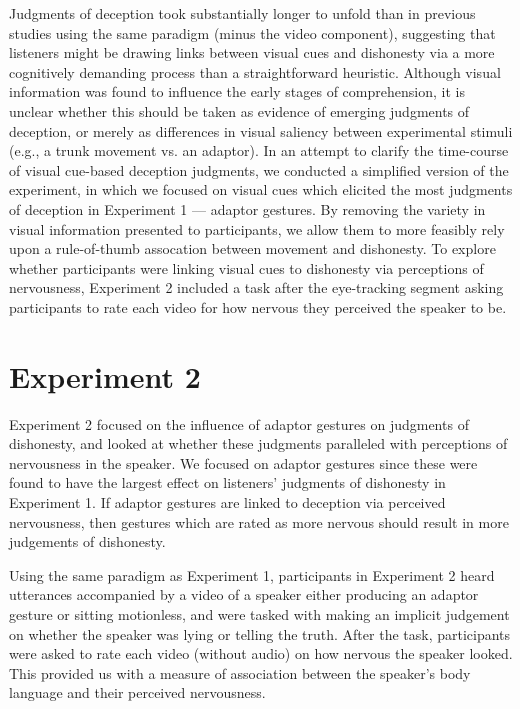 \documentclass[a4paper,man,natbib]{apa6}
\begin{document}
Judgments of deception took substantially longer to unfold than in previous studies using the same paradigm (minus the video component), suggesting that listeners might be drawing links between visual cues and dishonesty via a more cognitively demanding process than a straightforward heuristic.
Although visual information was found to influence the early stages of comprehension, it is unclear whether this should be taken as evidence of emerging judgments of deception, or merely as differences in visual saliency between experimental stimuli (e.g., a trunk movement vs. an adaptor).
In an attempt to clarify the time-course of visual cue-based deception judgments, we conducted a simplified version of the experiment, in which we focused on visual cues which elicited the most judgments of deception in Experiment 1 --- adaptor gestures.
By removing the variety in visual information presented to participants, we allow them to more feasibly rely upon a rule-of-thumb assocation between movement and dishonesty. %
To explore whether participants were linking visual cues to dishonesty via perceptions of nervousness, Experiment 2 included a task after the eye-tracking segment asking participants to rate each video for how nervous they perceived the speaker to be.

\section{Experiment 2}
Experiment 2 focused on the influence of adaptor gestures on judgments of dishonesty, and looked at whether these judgments paralleled with perceptions of nervousness in the speaker.
We focused on adaptor gestures since these were found to have the largest effect on listeners' judgments of dishonesty in Experiment 1. 
If adaptor gestures are linked to deception via perceived nervousness, then gestures which are rated as more nervous should result in more judgements of dishonesty. 

Using the same paradigm as Experiment 1, participants in Experiment 2 heard utterances accompanied by a video of a speaker either producing an adaptor gesture or sitting motionless, and were tasked with making an implicit judgement on whether the speaker was lying or telling the truth. 
After the task, participants were asked to rate each video (without audio) on how nervous the speaker looked.
This provided us with a measure of association between the speaker's body language and their perceived nervousness.
\end{document}
